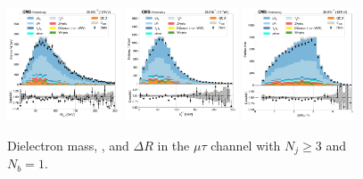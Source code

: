 \begin{figure}[htb!]
    \centering
    \includegraphics[width=0.3\textwidth]{chapters/Appendix/sectionPlots/figures/data_mc_overlays/mutau_2016_cat_gt3_eq1_signal_linear_lepton_dilepton1_mass}
    \includegraphics[width=0.3\textwidth]{chapters/Appendix/sectionPlots/figures/data_mc_overlays/mutau_2016_cat_gt3_eq1_signal_linear_lepton_dilepton1_pt}
    \includegraphics[width=0.3\textwidth]{chapters/Appendix/sectionPlots/figures/data_mc_overlays/mutau_2016_cat_gt3_eq1_signal_linear_lepton_dilepton1_delta_r}
    \caption{Dielectron mass, \pt, and $\Delta R$ in the $\mu\tau$ channel
    with $N_{j} \geq 3$ and $N_{b} = 1$.}
    \label{fig:mutau_7_dilepton}
\end{figure}


